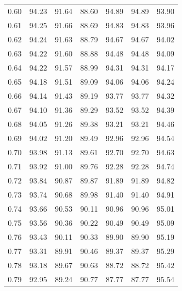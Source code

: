 \begin{tabular}{|c|c|c|c|c|c|c|}
      0.60 &     94.23 &     91.64 &      88.60 &   94.89 &      94.89 &         93.90 \\
      0.61 &     94.25 &     91.66 &      88.69 &   94.83 &      94.83 &         93.96 \\
      0.62 &     94.24 &     91.63 &      88.79 &   94.67 &      94.67 &         94.02 \\
      0.63 &     94.22 &     91.60 &      88.88 &   94.48 &      94.48 &         94.09 \\
      0.64 &     94.22 &     91.57 &      88.99 &   94.31 &      94.31 &         94.17 \\
      0.65 &     94.18 &     91.51 &      89.09 &   94.06 &      94.06 &         94.24 \\
      0.66 &     94.14 &     91.43 &      89.19 &   93.77 &      93.77 &         94.32 \\
      0.67 &     94.10 &     91.36 &      89.29 &   93.52 &      93.52 &         94.39 \\
      0.68 &     94.05 &     91.26 &      89.38 &   93.21 &      93.21 &         94.46 \\
      0.69 &     94.02 &     91.20 &      89.49 &   92.96 &      92.96 &         94.54 \\
      0.70 &     93.98 &     91.13 &      89.61 &   92.70 &      92.70 &         94.63 \\
      0.71 &     93.92 &     91.00 &      89.76 &   92.28 &      92.28 &         94.74 \\
      0.72 &     93.84 &     90.87 &      89.87 &   91.89 &      91.89 &         94.82 \\
      0.73 &     93.74 &     90.68 &      89.98 &   91.40 &      91.40 &         94.91 \\
      0.74 &     93.66 &     90.53 &      90.11 &   90.96 &      90.96 &         95.01 \\
      0.75 &     93.56 &     90.36 &      90.22 &   90.49 &      90.49 &         95.09 \\
      0.76 &     93.43 &     90.11 &      90.33 &   89.90 &      89.90 &         95.19 \\
      0.77 &     93.31 &     89.91 &      90.46 &   89.37 &      89.37 &         95.29 \\
      0.78 &     93.18 &     89.67 &      90.63 &   88.72 &      88.72 &         95.42 \\
      0.79 &     92.95 &     89.24 &      90.77 &   87.77 &      87.77 &         95.54 \\

\end{tabular}
